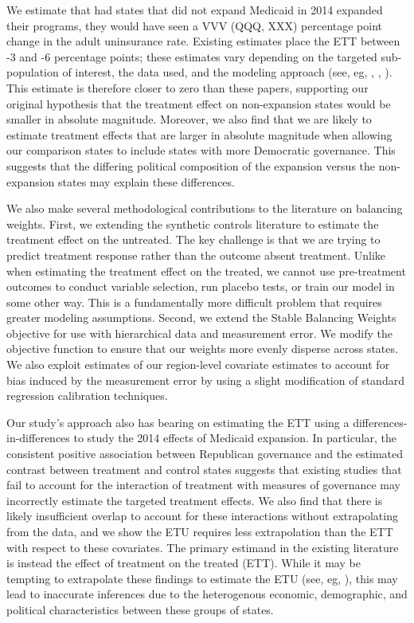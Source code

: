 \documentclass[12pt]{article}
\begin{document}
We estimate that had states that did not expand Medicaid in 2014 expanded their programs, they would have seen a VVV (QQQ, XXX) percentage point change in the adult uninsurance rate. Existing estimates place the ETT between -3 and -6 percentage points; these estimates vary depending on the targeted sub-population of interest, the data used, and the modeling approach (see, eg, \cite{courtemanche2017early}, \cite{kaestner2017effects}, \cite{frean2017premium}). This estimate is therefore closer to zero than these  papers, supporting our original hypothesis that the treatment effect on non-expansion states would be smaller in absolute magnitude. Moreover, we also find that we are likely to estimate treatment effects that are larger in absolute magnitude when allowing our comparison states to include states with more Democratic governance. This suggests that the differing political composition of the expansion versus the non-expansion states may explain these differences.

We also make several methodological contributions to the literature on balancing weights. First, we extending the synthetic controls literature to estimate the treatment effect on the untreated. The key challenge is that we are trying to predict treatment response rather than the outcome absent treatment. Unlike when estimating the treatment effect on the treated, we cannot use pre-treatment outcomes to conduct variable selection, run placebo tests, or train our model in some other way. This is a fundamentally more difficult problem that requires greater modeling assumptions. Second, we extend the Stable Balancing Weights objective for use with hierarchical data and measurement error. We modify the objective function to ensure that our weights more evenly disperse across states. We also exploit estimates of our region-level covariate estimates to account for bias induced by the measurement error by using a slight modification of standard regression calibration techniques.

Our study's approach also has bearing on estimating the ETT using a differences-in-differences to study the 2014 effects of Medicaid expansion. In particular, the consistent positive association between Republican governance and the estimated contrast between treatment and control states suggests that existing studies that fail to account for the interaction of treatment with measures of governance may incorrectly estimate the targeted treatment effects. We also find that there is likely insufficient overlap to account for these interactions without extrapolating from the data, and we show the ETU requires less extrapolation than the ETT with respect to these covariates. The primary estimand in the existing literature is instead the effect of treatment on the treated (ETT). While it may be tempting to extrapolate these findings to estimate the ETU (see, eg, \cite{miller2019medicaid}), this may lead to inaccurate inferences due to the heterogenous economic, demographic, and political characteristics between these groups of states.
\end{document}
